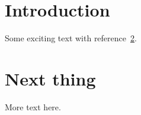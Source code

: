 \documentclass{article}
\begin{document}
\section{Introduction}
Some exciting text with  reference~\ref{sec:next}.

\section{Next thing}
\label{sec:next}

More text here.
\end{document}
